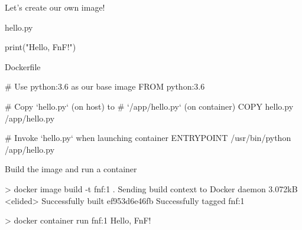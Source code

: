 \documentclass{beamer}
\renewcommand\big[1]{
  \begin{center}
    \Large{#1}
  \end{center}
}
\begin{document}
\begin{frame}
  \big{Let's create our own image!}
\end{frame}

\begin{frame}[fragile]
  \big{hello.py}
  \begin{mylisting}
    print("Hello, FnF!")
  \end{mylisting}

  \big{Dockerfile}
  \begin{mylisting}
    # Use python:3.6 as our base image
    FROM python:3.6

    # Copy `hello.py` (on host) to
    # `/app/hello.py` (on container)
    COPY hello.py /app/hello.py

    # Invoke `hello.py` when launching container
    ENTRYPOINT /usr/bin/python /app/hello.py
  \end{mylisting}
\end{frame}

\begin{frame}[fragile]
  \big{Build the image and run a container}

  \begin{mylisting}
> docker image build -t fnf:1 .
Sending build context to Docker daemon  3.072kB
<elided>
Successfully built ef953d6e46fb
Successfully tagged fnf:1

> docker container run fnf:1
Hello, FnF!
  \end{mylisting}
\end{frame}
\end{document}
